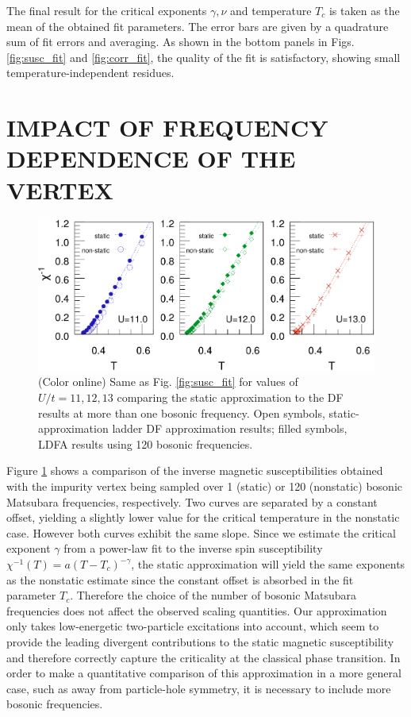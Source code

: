 \documentclass[aps,prb,twocolumn,amsmath,notitlepage,floatfix,footinbib,superscriptaddress,showpacs, showkeys]{revtex4-1}
\begin{document}
\begin{appendix}
The final result for the critical exponents $\gamma, \nu$ and temperature $T_c$ is taken as the mean of the obtained fit parameters. The error bars are given by a quadrature sum of fit errors and averaging. 
As shown in the bottom panels in Figs. \ref{fig:susc_fit} and \ref{fig:corr_fit}, the quality of the fit is satisfactory, showing small temperature-independent residues.

\section{IMPACT OF FREQUENCY DEPENDENCE OF THE VERTEX}\label{app:static_nonstatic}

\begin{figure}[ht]
 \begin{center}
  \includegraphics[width=\columnwidth]{app_fig2.pdf}\vspace*{-1.5em}
  \caption{(Color online) Same as Fig. \ref{fig:susc_fit} for values of $U/t=11,12,13$ comparing the static approximation to the DF results at more than one bosonic frequency. Open symbols, static-approximation ladder DF approximation results; filled symbols, LDFA results using 120 bosonic frequencies. }
 \end{center}
 \label{fig:maize_and_blues}
\end{figure}

Figure \ref{fig:maize_and_blues} shows a comparison of the inverse magnetic susceptibilities obtained with the impurity vertex being sampled over 1 (static) or 120 (nonstatic) bosonic Matsubara frequencies, respectively. Two curves are separated by a constant offset, yielding a slightly lower value for the critical temperature in the nonstatic case. However both curves exhibit the same slope. Since we estimate the critical exponent $\gamma$ from a power-law fit to the inverse spin susceptibility $\chi^{-1}(T)=a(T-T_c)^{-\gamma}$, the static approximation will yield the same exponents as the nonstatic estimate since the constant offset is absorbed in the fit parameter $T_c$. Therefore the choice of the number of bosonic Matsubara frequencies does not affect the observed scaling quantities. Our approximation only takes low-energetic two-particle excitations into account, which seem to provide the leading divergent contributions to the static magnetic susceptibility and therefore correctly capture the criticality at the classical phase transition. In order to make a quantitative comparison of this approximation in a more general case, such as away from particle-hole symmetry, it is necessary to include more bosonic frequencies.

\end{appendix}


\end{document}
